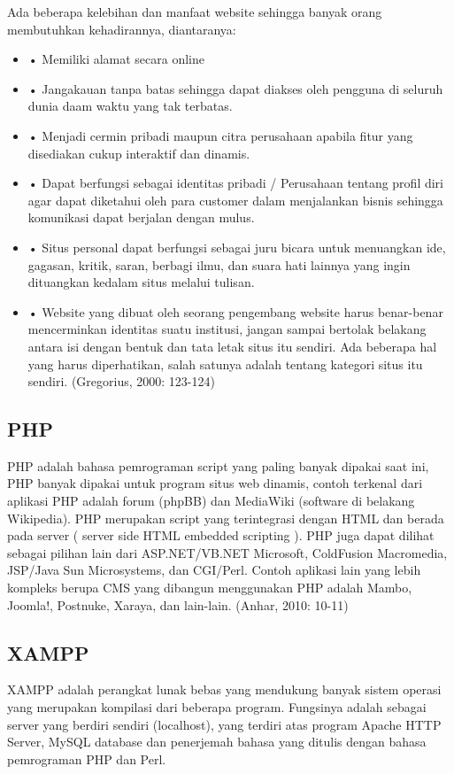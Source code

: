 \documentclass{jtetiproposalskripsi}
\begin{document}
Ada beberapa kelebihan dan manfaat website sehingga banyak orang membutuhkan kehadirannya, diantaranya:
\begin{itemize}
\item •	Memiliki alamat secara online
\item •	Jangakauan tanpa batas sehingga dapat diakses oleh pengguna di seluruh dunia daam waktu yang tak terbatas.
\item •	Menjadi cermin pribadi maupun citra perusahaan apabila fitur yang disediakan cukup interaktif dan dinamis. 
\item •	Dapat berfungsi sebagai identitas pribadi / Perusahaan tentang profil diri agar dapat diketahui oleh para customer dalam menjalankan bisnis sehingga komunikasi dapat berjalan dengan mulus.
\item •	Situs personal dapat berfungsi sebagai juru bicara untuk menuangkan ide, gagasan, kritik, saran, berbagi ilmu, dan suara hati lainnya yang ingin dituangkan kedalam situs melalui tulisan.
\item •	Website yang dibuat oleh seorang pengembang website harus benar-benar mencerminkan identitas suatu institusi, jangan sampai bertolak belakang antara isi dengan bentuk dan tata letak situs itu sendiri. Ada beberapa hal yang harus diperhatikan, salah satunya adalah tentang kategori situs itu sendiri. (Gregorius, 2000: 123-124)

\end{itemize}

\subsection{PHP}
PHP adalah bahasa pemrograman script yang paling banyak dipakai saat ini, PHP banyak dipakai untuk program situs web dinamis, contoh terkenal dari aplikasi PHP adalah forum (phpBB) dan MediaWiki (software di belakang Wikipedia). PHP merupakan script yang terintegrasi dengan HTML dan berada pada server ( server side HTML embedded scripting ). PHP juga dapat dilihat sebagai pilihan lain dari ASP.NET/VB.NET Microsoft, ColdFusion Macromedia, JSP/Java Sun Microsystems, dan CGI/Perl. Contoh aplikasi lain yang lebih kompleks berupa CMS yang dibangun menggunakan PHP adalah Mambo, Joomla!, Postnuke, Xaraya, dan lain-lain. (Anhar, 2010: 10-11)

\subsection{XAMPP}
XAMPP adalah perangkat lunak bebas yang mendukung banyak sistem operasi yang merupakan kompilasi dari beberapa program. Fungsinya adalah sebagai server yang berdiri sendiri (localhost), yang terdiri atas program Apache HTTP Server, MySQL database dan penerjemah bahasa yang ditulis dengan bahasa pemrograman PHP dan Perl.
\end{document}
